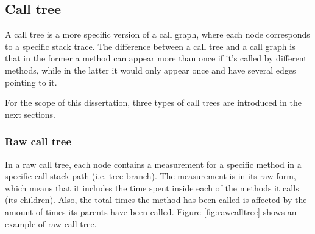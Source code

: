 \subsection{Call tree}
A call tree is a more specific version of a call graph\cite{GKM00}, where each node corresponds to a specific stack trace. The difference between a call tree and a call graph is that in the former a method can appear more than once if it's called by different methods, while in the latter it would only appear once and have several edges pointing to it.

\noindent For the scope of this dissertation, three types of call trees are introduced in the next sections.

\subsubsection{Raw call tree}
In a raw call tree, each node contains a measurement for a specific method in a specific call stack path (i.e. tree branch). The measurement is in its raw form, which means that it includes the time spent inside each of the methods it calls (its children). Also, the total times the method has been called is affected by the amount of times its parents have been called. Figure \ref{fig:rawcalltree} shows an example of raw call tree.

